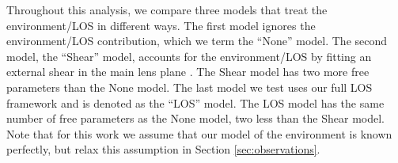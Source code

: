 Throughout this analysis, we compare three models that treat the environment/LOS in different ways. The first model ignores the environment/LOS contribution, which we term the ``None'' model. The second model, the ``Shear'' model, accounts for the environment/LOS by fitting an external shear in the main lens plane \citep[e.g.,][]{Suyu13}. The Shear model has two more free parameters than the None model. The last model we test uses our full LOS framework and is denoted as the ``LOS'' model. The LOS model has the same number of free parameters as the None model, two less than the Shear model. Note that for this work we assume that our model of the environment is known perfectly, but relax this assumption in Section \ref{sec:observations}.
  